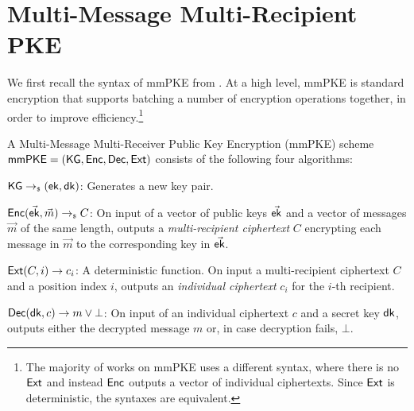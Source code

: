 \section{Multi-Message Multi-Recipient PKE}\label{sec:mmpke}
We first recall the syntax of mmPKE from \cite{PKC:BelBolSta03}. At a high level, mmPKE is standard encryption that
supports batching a number of encryption operations together, in order to improve efficiency.\footnote{The majority of
  works on mmPKE uses a different syntax, where there is no ${\mathsf{Ext}}$ and instead ${\mathsf{Enc}}$ outputs a vector of
  individual ciphertexts. Since ${\mathsf{Ext}}$ is deterministic, the syntaxes are equivalent.}%
%
%
\begin{definition}[\mmPKE]
  A Multi-Message Multi-Receiver Public Key Encryption (mmPKE) scheme ${\mathsf{mmPKE}} = \allowbreak({\mathsf{KG}},\allowbreak {\ensuremath{\mathsf{Enc}}},\allowbreak {\ensuremath{\mathsf{Dec}}}, {\mathsf{Ext}})$ consists of the following four algorithms:
  \begin{description}[align=left, nosep]
  \item[]${\mathsf{KG}} \rightarrow_{\scriptscriptstyle\$} ({\mathsf{ek}}, {\mathsf{dk}})$: Generates a new key pair.
  \item[]${\mathsf{Enc}}(\vec{{\mathsf{ek}}}, \vec{m})\rightarrow_{\scriptscriptstyle\$} C$: On input of a vector of
    public keys $\vec{{\mathsf{ek}}}$ and a vector of messages $\vec{m}$ of the same length, outputs a \emph{multi-recipient ciphertext} $C$ encrypting each message in $\vec{m}$ to the corresponding key in $\vec{{\mathsf{ek}}}$.
  \item[]${\mathsf{Ext}}(C, i)\rightarrow c_i$: A deterministic function. On input a multi-recipient ciphertext $C$ and a position index $i$, outputs an \emph{individual ciphertext} $c_i$ for the $i$-th recipient.
  \item[]${\mathsf{Dec}}({\mathsf{dk}},c)\rightarrow m\vee\bot$: On input of an individual ciphertext $c$ and a secret key ${\mathsf{dk}}$, outputs either the decrypted message $m$ or, in case decryption fails, $\bot$.
  \end{description}
\end{definition}

